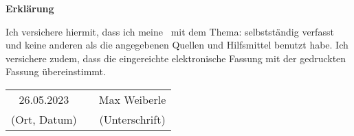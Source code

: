 \clearpage

\thispagestyle{empty}

{\LARGE\textsf{\textbf{Erklärung}}\bigskip}

Ich versichere hiermit, dass ich meine \typMeinerArbeit\ mit dem Thema: \emph{\themaMeinerArbeit} selbstständig verfasst und keine anderen als die angegebenen Quellen und Hilfsmittel benutzt habe.
Ich versichere zudem, dass die eingereichte elektronische Fassung mit der gedruckten Fassung übereinstimmt.

\vspace{3cm}

\begin{center}
  \begin{tabular}{ccc}
    26.05.2023   & \hspace{0.3\linewidth} & Max Weiberle   \\
    (Ort, Datum) & \hspace{0.3\linewidth} & (Unterschrift) \\
  \end{tabular}
\end{center}
